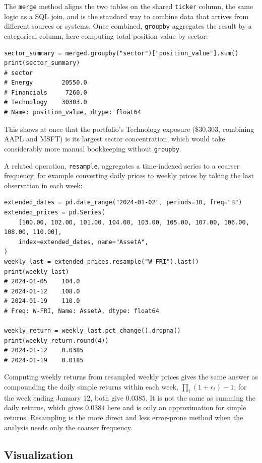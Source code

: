 \documentclass[../ai_in_finance]{subfiles}
\begin{document}
The \texttt{merge} method aligns the two tables on the shared \texttt{ticker} column, the same logic as a SQL join, and is the standard way to combine data that arrives from different sources or systems. Once combined, \texttt{groupby} aggregates the result by a categorical column, here computing total position value by sector:

\begin{verbatim}
sector_summary = merged.groupby("sector")["position_value"].sum()
print(sector_summary)
# sector
# Energy        20550.0
# Financials     7260.0
# Technology    30303.0
# Name: position_value, dtype: float64
\end{verbatim}

This shows at once that the portfolio's Technology exposure (\$30,303, combining AAPL and MSFT) is its largest sector concentration, which would take considerably more manual bookkeeping without \texttt{groupby}.

A related operation, \texttt{resample}, aggregates a time-indexed series to a coarser frequency, for example converting daily prices to weekly prices by taking the last observation in each week:

\begin{verbatim}
extended_dates = pd.date_range("2024-01-02", periods=10, freq="B")
extended_prices = pd.Series(
    [100.00, 102.00, 101.00, 104.00, 103.00, 105.00, 107.00, 106.00, 108.00, 110.00],
    index=extended_dates, name="AssetA",
)
weekly_last = extended_prices.resample("W-FRI").last()
print(weekly_last)
# 2024-01-05    104.0
# 2024-01-12    108.0
# 2024-01-19    110.0
# Freq: W-FRI, Name: AssetA, dtype: float64

weekly_return = weekly_last.pct_change().dropna()
print(weekly_return.round(4))
# 2024-01-12    0.0385
# 2024-01-19    0.0185
\end{verbatim}

Computing weekly returns from resampled weekly prices gives the same answer as compounding the daily simple returns within each week, $\prod_t (1+r_t) - 1$; for the week ending January 12, both give $0.0385$. It is not the same as summing the daily returns, which gives $0.0384$ here and is only an approximation for simple returns. Resampling is the more direct and less error-prone method when the analysis needs only the coarser frequency.

\subsection{Visualization}
\end{document}
